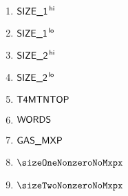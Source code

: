\begin{description}
\begin{multicols}{3}
\begin{enumerate}
				\item $\textsf{SIZE}\textsf{\_1}^{\mathsf{\,hi}}$
				\item $\textsf{SIZE}\textsf{\_1}^{\mathsf{\,lo}}$
				\item $\textsf{SIZE}\textsf{\_2}^{\mathsf{\,hi}}$
				\item $\textsf{SIZE}\textsf{\_2}^{\mathsf{\,lo}}$
				\item $\textsf{T4MTNTOP}$
				\item $\textsf{WORDS}$
				\item $\textsf{GAS}\textsf{\_MXP}$
				\item $\sizeOneNonzeroNoMxpx$
				\item $\sizeTwoNonzeroNoMxpx$
			\end{enumerate}
		\end{multicols}
\end{description}
